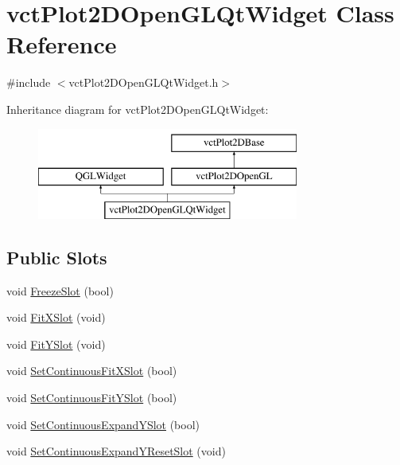 \hypertarget{classvct_plot2_d_open_g_l_qt_widget}{}\section{vct\+Plot2\+D\+Open\+G\+L\+Qt\+Widget Class Reference}
\label{classvct_plot2_d_open_g_l_qt_widget}


{\ttfamily \#include $<$vct\+Plot2\+D\+Open\+G\+L\+Qt\+Widget.\+h$>$}

Inheritance diagram for vct\+Plot2\+D\+Open\+G\+L\+Qt\+Widget\+:\begin{figure}[H]
\begin{center}
\leavevmode
\includegraphics[height=3.000000cm]{d5/dc9/classvct_plot2_d_open_g_l_qt_widget}
\end{center}
\end{figure}
\subsection*{Public Slots}
\begin{DoxyCompactItemize}
\item 
void \hyperlink{classvct_plot2_d_open_g_l_qt_widget_a591ce1a2b895f3057462a57bfde32ede}{Freeze\+Slot} (bool)
\item 
void \hyperlink{classvct_plot2_d_open_g_l_qt_widget_a060bd8dab2f9dae6aa0d31444187e35d}{Fit\+X\+Slot} (void)
\item 
void \hyperlink{classvct_plot2_d_open_g_l_qt_widget_a28388e00a0069dbefcc351761f8a17f5}{Fit\+Y\+Slot} (void)
\item 
void \hyperlink{classvct_plot2_d_open_g_l_qt_widget_ae037064d590d6566c16c55651619bd77}{Set\+Continuous\+Fit\+X\+Slot} (bool)
\item 
void \hyperlink{classvct_plot2_d_open_g_l_qt_widget_aabf83d45db3de342269a3394a0a895cf}{Set\+Continuous\+Fit\+Y\+Slot} (bool)
\item 
void \hyperlink{classvct_plot2_d_open_g_l_qt_widget_afe4bac2aae71a08ad5ee96f4910a10c5}{Set\+Continuous\+Expand\+Y\+Slot} (bool)
\item 
void \hyperlink{classvct_plot2_d_open_g_l_qt_widget_a2bc31c056ccf0bddfe4cbd708e70fd44}{Set\+Continuous\+Expand\+Y\+Reset\+Slot} (void)
\end{DoxyCompactItemize}
